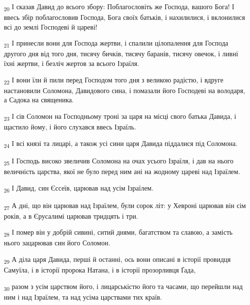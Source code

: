 \begin{tcolorbox}
\textsubscript{20} І сказав Давид до всього збору: Поблагословіть же Господа, вашого Бога! І ввесь збір поблагословив Господа, Бога своїх батьків, і нахилилися, і вклонилися всі до землі Господеві й цареві!
\end{tcolorbox}
\begin{tcolorbox}
\textsubscript{21} І принесли вони для Господа жертви, і спалили цілопалення для Господа другого дня від того дня, тисячу бичків, тисячу баранів, тисячу овечок, і ливні їхні жертви, і безліч жертов за всього Ізраїля.
\end{tcolorbox}
\begin{tcolorbox}
\textsubscript{22} І вони їли й пили перед Господом того дня з великою радістю, і вдруге настановили Соломона, Давидового сина, і помазали його Господеві на володаря, а Садока на священика.
\end{tcolorbox}
\begin{tcolorbox}
\textsubscript{23} І сів Соломон на Господньому троні за царя на місці свого батька Давида, і щастило йому, і його слухався ввесь Ізраїль.
\end{tcolorbox}
\begin{tcolorbox}
\textsubscript{24} І всі князі та лицарі, а також усі сини царя Давида піддалися під Соломона.
\end{tcolorbox}
\begin{tcolorbox}
\textsubscript{25} І Господь високо звеличив Соломона на очах усього Ізраїля, і дав на нього величність царства, якої не було перед ним ані на жодному цареві над Ізраїлем.
\end{tcolorbox}
\begin{tcolorbox}
\textsubscript{26} І Давид, син Єссеїв, царював над усім Ізраїлем.
\end{tcolorbox}
\begin{tcolorbox}
\textsubscript{27} А дні, що він царював над Ізраїлем, були сорок літ: у Хевроні царював він сім років, а в Єрусалимі царював тридцять і три.
\end{tcolorbox}
\begin{tcolorbox}
\textsubscript{28} І помер він у добрій сивині, ситий днями, багатством та славою, а замість нього зацарював син його Соломон.
\end{tcolorbox}
\begin{tcolorbox}
\textsubscript{29} А діла царя Давида, перші й останні, ось вони описані в історії провидця Самуїла, і в історії пророка Натана, і в історії прозорливця Ґада,
\end{tcolorbox}
\begin{tcolorbox}
\textsubscript{30} разом з усім царством його, і лицарськістю його та часами, що перейшли над ним і над Ізраїлем, та над усіма царствами тих країв.
\end{tcolorbox}
